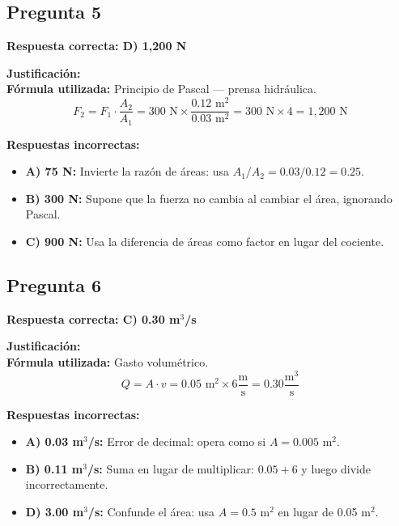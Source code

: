 \begin{respuestabox}
\subsection*{Pregunta 5}
\textcolor{verdecorrecto}{\textbf{Respuesta correcta: D) 1{,}200 N}}

\textbf{Justificación:}\\
\textbf{Fórmula utilizada:} Principio de Pascal --- prensa hidráulica.
$$F_2 = F_1 \cdot \frac{A_2}{A_1} = 300 \text{ N} \times \frac{0.12 \text{ m}^2}{0.03 \text{ m}^2} = 300 \text{ N} \times 4 = 1{,}200 \text{ N}$$

\textbf{Respuestas incorrectas:}
\begin{itemize}
    \item \textbf{A) 75 N:} Invierte la razón de áreas: usa $A_1/A_2 = 0.03/0.12 = 0.25$.
    \item \textbf{B) 300 N:} Supone que la fuerza no cambia al cambiar el área, ignorando Pascal.
    \item \textbf{C) 900 N:} Usa la diferencia de áreas como factor en lugar del cociente.
\end{itemize}
\end{respuestabox}

\begin{respuestabox}
\subsection*{Pregunta 6}
\textcolor{verdecorrecto}{\textbf{Respuesta correcta: C) 0.30 m$^3$/s}}

\textbf{Justificación:}\\
\textbf{Fórmula utilizada:} Gasto volumétrico.
$$Q = A \cdot v = 0.05 \text{ m}^2 \times 6 \frac{\text{m}}{\text{s}} = 0.30 \frac{\text{m}^3}{\text{s}}$$

\textbf{Respuestas incorrectas:}
\begin{itemize}
    \item \textbf{A) 0.03 m$^3$/s:} Error de decimal: opera como si $A = 0.005$ m$^2$.
    \item \textbf{B) 0.11 m$^3$/s:} Suma en lugar de multiplicar: $0.05 + 6$ y luego divide incorrectamente.
    \item \textbf{D) 3.00 m$^3$/s:} Confunde el área: usa $A = 0.5$ m$^2$ en lugar de 0.05 m$^2$.
\end{itemize}
\end{respuestabox}

